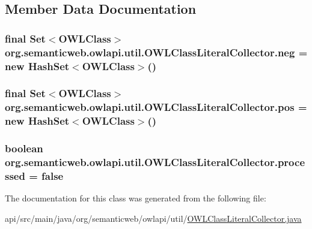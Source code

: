 \subsection{Member Data Documentation}
\hypertarget{classorg_1_1semanticweb_1_1owlapi_1_1util_1_1_o_w_l_class_literal_collector_a6a855a28c82d1c60e2538fe95cff9edd}{
\subsubsection[{neg}]{\setlength{\rightskip}{0pt plus 5cm}final Set$<${\bf O\-W\-L\-Class}$>$ org.\-semanticweb.\-owlapi.\-util.\-O\-W\-L\-Class\-Literal\-Collector.\-neg = new Hash\-Set$<${\bf O\-W\-L\-Class}$>$()\hspace{0.3cm}{\ttfamily [protected]}}}\label{classorg_1_1semanticweb_1_1owlapi_1_1util_1_1_o_w_l_class_literal_collector_a6a855a28c82d1c60e2538fe95cff9edd}
\hypertarget{classorg_1_1semanticweb_1_1owlapi_1_1util_1_1_o_w_l_class_literal_collector_a07a73254c2046423d05b1d8958851334}{
\subsubsection[{pos}]{\setlength{\rightskip}{0pt plus 5cm}final Set$<${\bf O\-W\-L\-Class}$>$ org.\-semanticweb.\-owlapi.\-util.\-O\-W\-L\-Class\-Literal\-Collector.\-pos = new Hash\-Set$<${\bf O\-W\-L\-Class}$>$()\hspace{0.3cm}{\ttfamily [protected]}}}\label{classorg_1_1semanticweb_1_1owlapi_1_1util_1_1_o_w_l_class_literal_collector_a07a73254c2046423d05b1d8958851334}
\hypertarget{classorg_1_1semanticweb_1_1owlapi_1_1util_1_1_o_w_l_class_literal_collector_a71a9de71d00684a6fedab1ba4b37f964}{
\subsubsection[{processed}]{\setlength{\rightskip}{0pt plus 5cm}boolean org.\-semanticweb.\-owlapi.\-util.\-O\-W\-L\-Class\-Literal\-Collector.\-processed = false\hspace{0.3cm}{\ttfamily [private]}}}\label{classorg_1_1semanticweb_1_1owlapi_1_1util_1_1_o_w_l_class_literal_collector_a71a9de71d00684a6fedab1ba4b37f964}


The documentation for this class was generated from the following file\-:\begin{DoxyCompactItemize}
\item 
api/src/main/java/org/semanticweb/owlapi/util/\hyperlink{_o_w_l_class_literal_collector_8java}{O\-W\-L\-Class\-Literal\-Collector.\-java}\end{DoxyCompactItemize}
